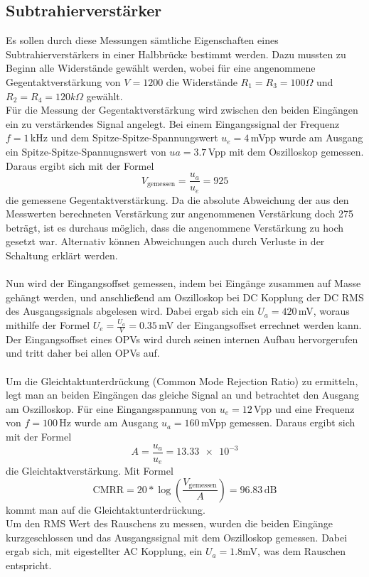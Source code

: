 \subsection{Subtrahierverstärker}
\label{sec:subtrahier}
Es sollen durch diese Messungen sämtliche Eigenschaften eines Subtrahierverstärkers in einer Halbbrücke bestimmt werden. Dazu mussten zu Beginn alle Widerstände gewählt werden, wobei für eine angenommene Gegentaktverstärkung von $V=1200$ die Widerstände $R_1=R_3=100\Omega$ und $R_2=R_4=120k\Omega$ gewählt. \\
Für die Messung der Gegentaktverstärkung wird zwischen den beiden Eingängen ein zu verstärkendes Signal angelegt. Bei einem Eingangssignal der Frequenz $f=1\,$kHz und dem Spitze-Spitze-Spannungswert $u_e=4\,$mVpp wurde am Ausgang ein Spitze-Spitze-Spannugnswert von $ua=3.7\,$Vpp mit dem Oszilloskop gemessen. Daraus ergibt sich mit der Formel 
\begin{equation}
	V_\text{gemessen}=\frac{u_a}{u_e}=925
\end{equation} die gemessene Gegentaktverstärkung. Da die absolute Abweichung der aus den Messwerten berechneten Verstärkung zur angenommenen Verstärkung doch 275 beträgt, ist es durchaus möglich, dass die angenommene Verstärkung zu hoch gesetzt war. Alternativ können Abweichungen auch durch Verluste in der Schaltung erklärt werden. \\ \\
Nun wird der Eingangsoffset gemessen, indem bei Eingänge zusammen auf Masse gehängt werden, und anschließend am Oszilloskop bei DC Kopplung der DC RMS des Ausgangssignals abgelesen wird. Dabei ergab sich ein $U_a=420\,$mV, woraus mithilfe der Formel $U_e=\frac{U_a}{V}=0.35\,$mV der Eingangsoffset errechnet werden kann. Der Eingangsoffset eines OPVs wird durch seinen internen Aufbau hervorgerufen und tritt daher bei allen OPVs auf. \\ \\
Um die Gleichtaktunterdrückung (Common Mode Rejection Ratio) zu ermitteln, legt man an beiden Eingängen das gleiche Signal an und betrachtet den Ausgang am Oszilloskop. Für eine Eingangsspannung von $u_e=12\,$Vpp und eine Frequenz von $f=100\,$Hz wurde am Ausgang $u_a=160\,$mVpp gemessen. Daraus ergibt sich mit der Formel
\begin{equation}
	A=\frac{u_a}{u_e}=\num{13.33e-3}
\end{equation}
die Gleichtaktverstärkung. Mit Formel 
\begin{equation}
	\text{CMRR}=20*\log(\frac{V_{\text{gemessen}}}{A})=96.83\,\text{dB} 
\end{equation}
kommt man auf die Gleichtaktunterdrückung. \\
Um den RMS Wert des Rauschens zu messen, wurden die beiden Eingänge kurzgeschlossen und das Ausgangssignal mit dem Oszilloskop gemessen. Dabei ergab sich, mit eigestellter AC Kopplung, ein $U_a=1.8$mV, was dem Rauschen entspricht.

